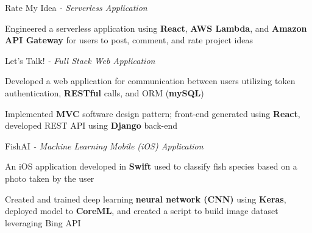 \begin{siderulesProj}
\par\addvspace{-1.2ex}
\begin{cventriesproject}
  \cventryproject
  {Rate My Idea  \hspace{0.15em}\bodyfontlight\itshape{- Serverless Application}}
  {
    \begin{cvskillitems}
      \item {Engineered a serverless application using \textbf{React}, \textbf{AWS Lambda}, and \textbf{Amazon API Gateway} for users to post, comment, and rate project ideas }
    \end{cvskillitems}
  }
  \cventryproject
    {Let's Talk!  \hspace{0.15em}\bodyfontlight\itshape{- Full Stack Web Application}}
    {
      \begin{cvskillitems}
        \item {Developed a web application for communication between users utilizing token authentication, \textbf{RESTful} calls, and ORM (\textbf{mySQL})}
        \item {Implemented \textbf{MVC} software design pattern; front-end generated using \textbf{React}, developed REST API using \textbf{Django} back-end}
      \end{cvskillitems}
    }
  \cventryproject
    {FishAI  \hspace{0.15em}\bodyfontlight\itshape{- Machine Learning Mobile (iOS) Application}}
    {
      \begin{cvskillitems}
        \item {An iOS application developed in \textbf{Swift} used to classify fish species based on a photo taken by the user}
        \item {Created and trained deep learning \textbf{neural network (CNN)} using \textbf{Keras}, deployed model to \textbf{CoreML}, and created a script to build image dataset leveraging Bing API}
      \end{cvskillitems}
    }
\end{cventriesproject}
\end{siderulesProj}
